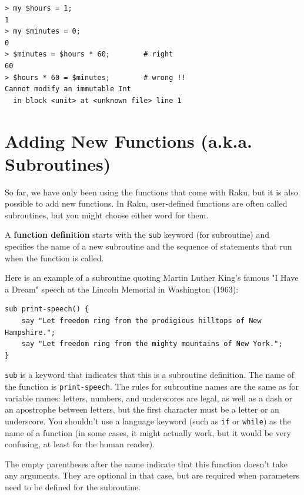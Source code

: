 \begin{verbatim}
> my $hours = 1;
1
> my $minutes = 0;
0
> $minutes = $hours * 60;        # right 
60
> $hours * 60 = $minutes;        # wrong !!
Cannot modify an immutable Int
  in block <unit> at <unknown file> line 1
\end{verbatim}
%


\section{Adding New Functions (a.k.a. Subroutines)}

So far, we have only been using the functions that come with Raku,
but it is also possible to add new functions. In Raku, user-defined
functions are often called subroutines, but you might choose 
either word for them. 

A {\bf function definition} starts with the {\tt sub} keyword (for
subroutine) and specifies the name of a new subroutine and
the sequence of statements that run when the function is called.

Here is an example of a subroutine quoting Martin Luther King's 
famous "I Have a Dream" speech at the Lincoln Memorial in 
Washington (1963):

\begin{verbatim}
sub print-speech() {
    say "Let freedom ring from the prodigious hilltops of New Hampshire.";
    say "Let freedom ring from the mighty mountains of New York.";
}
\end{verbatim}
%
{\tt sub} is a keyword that indicates that this is a subroutine
definition.  The name of the function is \verb"print-speech".  The
rules for subroutine names are the same as for variable names: letters,
numbers, and underscores are legal, as well as a dash or an 
apostrophe between letters, but the first character
must be a letter or an underscore.  You shouldn't use a 
language keyword (such as {\tt if} or {\tt while}) as 
the name of a function (in some cases, it might actually work, 
but it would be very confusing, at least for the human reader).

The empty parentheses after the name indicate that this function
doesn't take any arguments. They are optional in that case, but are 
required when parameters need to be defined for the subroutine.

